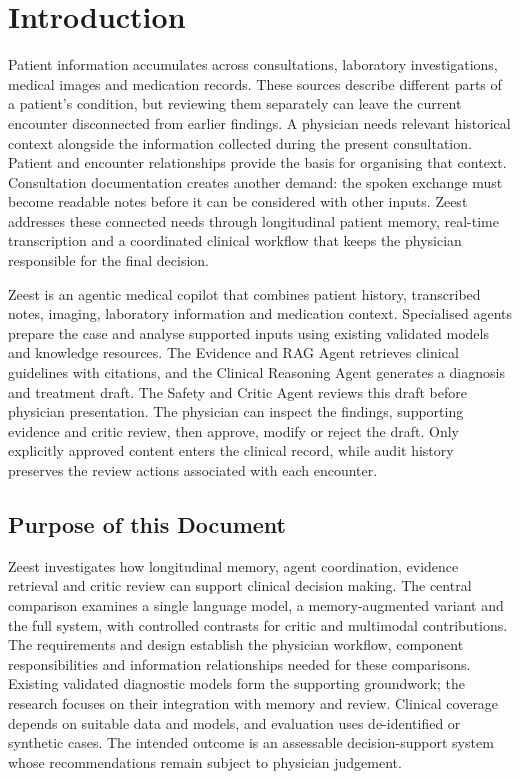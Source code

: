 \begingroup
\renewcommand{\encodingdefault}{T1}
\selectfont
\chapter{Introduction}

Patient information accumulates across consultations, laboratory investigations, medical images and medication records. These sources describe different parts of a patient's condition, but reviewing them separately can leave the current encounter disconnected from earlier findings. A physician needs relevant historical context alongside the information collected during the present consultation. Patient and encounter relationships provide the basis for organising that context.\cite{zeestA:mimicIV} Consultation documentation creates another demand: the spoken exchange must become readable notes before it can be considered with other inputs. Zeest addresses these connected needs through longitudinal patient memory, real-time transcription and a coordinated clinical workflow that keeps the physician responsible for the final decision.

Zeest is an agentic medical copilot that combines patient history, transcribed notes, imaging, laboratory information and medication context. Specialised agents prepare the case and analyse supported inputs using existing validated models and knowledge resources. The Evidence and RAG Agent retrieves clinical guidelines with citations, and the Clinical Reasoning Agent generates a diagnosis and treatment draft. The Safety and Critic Agent reviews this draft before physician presentation. The physician can inspect the findings, supporting evidence and critic review, then approve, modify or reject the draft. Only explicitly approved content enters the clinical record, while audit history preserves the review actions associated with each encounter.

\section{Purpose of this Document}

Zeest investigates how longitudinal memory, agent coordination, evidence retrieval and critic review can support clinical decision making. The central comparison examines a single language model, a memory-augmented variant and the full system, with controlled contrasts for critic and multimodal contributions. The requirements and design establish the physician workflow, component responsibilities and information relationships needed for these comparisons. Existing validated diagnostic models form the supporting groundwork; the research focuses on their integration with memory and review. Clinical coverage depends on suitable data and models, and evaluation uses de-identified or synthetic cases. The intended outcome is an assessable decision-support system whose recommendations remain subject to physician judgement.

